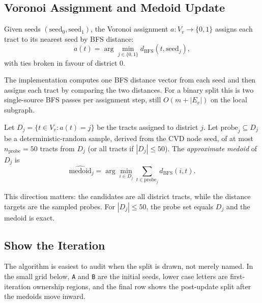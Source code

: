 \subsection{Voronoi Assignment and Medoid Update}

\begin{definition}
\label{def:voronoi-assign}
Given seeds $(\mathrm{seed}_0, \mathrm{seed}_1)$, the Voronoi assignment
$a: V_v \to \{0,1\}$ assigns each tract to its nearest seed by BFS distance:
\[
  a(t) = \arg\min_{j \in \{0,1\}} d_{\mathrm{BFS}}(t, \mathrm{seed}_j),
\]
with ties broken in favour of district 0.
\end{definition}

The implementation computes one BFS distance vector from each seed and then
assigns each tract by comparing the two distances.  For a binary split this is
two single-source BFS passes per assignment step, still $O(m+|E_v|)$ on the
local subgraph.

\begin{definition}
\label{def:medoid}
Let $D_j = \{t \in V_v : a(t) = j\}$ be the tracts assigned to district $j$.
Let $\mathrm{probe}_j \subseteq D_j$ be a deterministic-random sample, derived
from the CVD node seed, of at most $n_{\mathrm{probe}} = 50$ tracts from $D_j$
(or all tracts if $|D_j| \le 50$).
The \emph{approximate medoid} of $D_j$ is
\[
  \widehat{\mathrm{medoid}}_j =
  \arg\min_{i \in D_j} \sum_{t \in \mathrm{probe}_j} d_{\mathrm{BFS}}(i, t).
\]
\end{definition}

This direction matters: the candidates are all district tracts, while the
distance targets are the sampled probes.
For $|D_j| \le 50$, the probe set equals $D_j$ and the medoid is exact.

\subsection{Show the Iteration}

The algorithm is easiest to audit when the split is drawn, not merely named.
In the small grid below, \texttt{A} and \texttt{B} are the initial seeds, lower
case letters are first-iteration ownership regions, and the final row shows the
post-update split after the medoids move inward.

